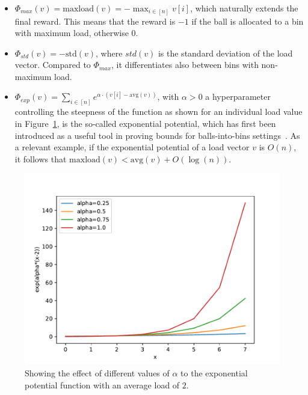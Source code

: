 \begin{itemize}
    \item
    $\Phi_{max}(v)=\mathrm{maxload}(v)=- \max_{i \in [n]} v[i]$, which naturally extends the final reward. This means that the reward is $-1$ if the ball is allocated to a bin with maximum load, otherwise $0$.
    \item
    $\Phi_{std}(v)=-\mathrm{std}(v)$, where $std(v)$ is the standard deviation of the load vector. Compared to $\Phi_{max}$, it differentiates also between bins with non-maximum load.
    \item
    $\Phi_{exp}(v)=\sum_{i \in [n]} e^{\alpha \cdot  (v[i] - \mathrm{avg}(v))}$, with $\alpha>0$ a hyperparameter controlling the steepness of the function as shown for an individual load value in Figure~\ref{exponential-potential-alpha}, is the so-called exponential potential, which has first been introduced as a useful tool in proving bounds for balls-into-bins settings~\cite{ghosh1999exponentialpotential}. As a relevant example, if the exponential potential of a load vector $v$ is $O(n)$, it follows that $\mathrm{maxload}(v) < \mathrm{avg}(v)+O(\log(n))$.
\end{itemize}


\begin{figure}[h]
    \centering
    \includegraphics[scale=0.7]{Chapter3/Figs/exponential_potential_analysis.pdf}
    \caption{Showing the effect of different values of $\alpha$ to the exponential potential function with an average load of $2$.}
    \label{exponential-potential-alpha}
\end{figure}



